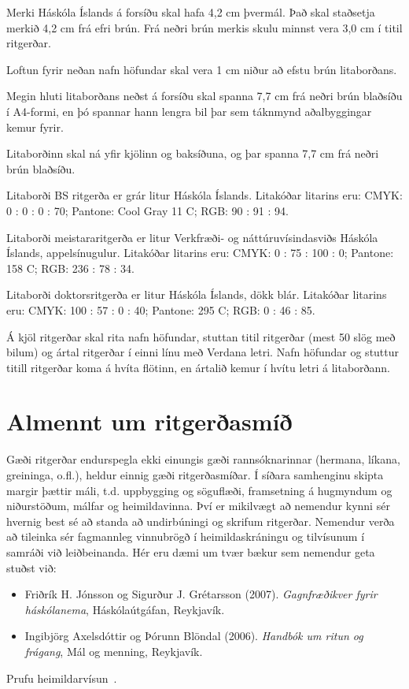 \documentclass[a4paper, 12pt, twoside]{scrreprt}
\begin{document}
Merki Háskóla Íslands á forsíðu skal hafa 4,2 cm þvermál. Það skal staðsetja merkið 4,2 cm frá efri brún. Frá neðri brún merkis skulu minnst vera 3,0 cm í titil ritgerðar.

Loftun fyrir neðan nafn höfundar skal vera 1 cm niður að efstu brún litaborðans.

Megin hluti litaborðans neðst á forsíðu skal spanna 7,7 cm frá neðri brún blaðsíðu í A4-formi, en þó spannar hann lengra bil þar sem táknmynd aðalbyggingar kemur fyrir.

Litaborðinn skal ná yfir kjölinn og baksíðuna, og þar spanna 7,7 cm frá neðri brún blaðsíðu.

Litaborði BS ritgerða er grár litur Háskóla Íslands. Litakóðar litarins eru: CMYK: 0 : 0 : 0 : 70; Pantone: Cool Gray 11 C; RGB: 90 : 91 : 94.

Litaborði meistararitgerða er litur Verkfræði- og náttúruvísindasviðs Háskóla Íslands, appelsínugulur. Litakóðar litarins eru: CMYK:  0 : 75 : 100 : 0; Pantone: 158 C; RGB: 236 : 78 : 34.

Litaborði doktorsritgerða er litur Háskóla Íslands, dökk blár. Litakóðar litarins eru: CMYK: 100 : 57 : 0 : 40; Pantone: 295 C; RGB: 0 : 46 : 85.

Á kjöl ritgerðar skal rita nafn höfundar, stuttan titil ritgerðar (mest 50 slög með bilum) og ártal ritgerðar í einni línu með Verdana letri. Nafn höfundar og stuttur titill ritgerðar koma á hvíta flötinn, en ártalið kemur í hvítu letri á litaborðann.

\section{Almennt um ritgerðasmíð}
Gæði ritgerðar endurspegla ekki einungis gæði rannsóknarinnar (hermana, líkana, greininga, o.fl.), heldur einnig gæði ritgerðasmíðar. Í síðara samhenginu skipta margir þættir máli, t.d. uppbygging og söguflæði, framsetning á hugmyndum og niðurstöðum, málfar og heimildavinna. Því er mikilvægt að nemendur kynni sér hvernig best sé að standa að undirbúningi og skrifum ritgerðar. Nemendur verða að tileinka sér fagmannleg vinnubrögð í heimildaskráningu og tilvísunum í samráði við leiðbeinanda. Hér eru dæmi um tvær bækur sem nemendur geta stuðst við:
\begin{itemize}
 \item Friðrík H. Jónsson og Sigurður J. Grétarsson (2007). \textit{Gagnfræðikver fyrir háskólanema}, Háskólaútgáfan, Reykjavík.
 \item Ingibjörg Axelsdóttir og Þórunn Blöndal (2006).  \textit{Handbók um ritun og frágang},  Mál og menning, Reykjavík.
\end{itemize}
Prufu heimildarvísun~\cite{knuth-fa}.
\end{document}
